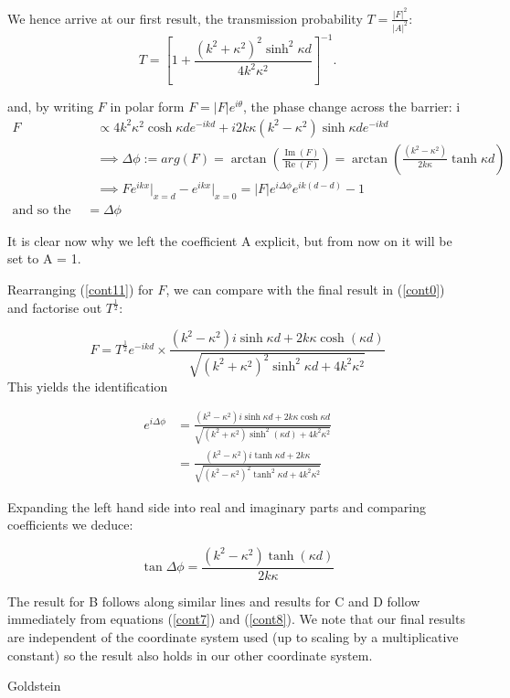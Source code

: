 \documentclass{article}
\begin{document}
We hence arrive at our first result, the transmission probability $T = \frac{|F|^2}{|A|^2}$:
\[
	T = [1+\frac{(k^2+\kappa^2)^2\sinh^2{\kappa d}}{4k^2\kappa^2}]^{-1}
.\] 

and, by writing $F$ in polar form $F = |F|e^{i\theta}$, the phase change across the barrier:
i
\begin{align}
	F &\propto 4k^2\kappa^2 \cosh{\kappa d}e^{-ikd}+i2k\kappa(k^2-\kappa^2)\sinh{\kappa d}e^{-ikd} \\
	  &\implies \Delta \phi := arg(F) = \arctan\left(\frac{\operatorname{Im}(F)}{\operatorname{Re}(F)}\right) = \arctan\left(\frac{(k^2-\kappa^2)}{2k\kappa}\tanh{\kappa d}\right) \\
	  &\implies Fe^{ikx}\rvert_{x=d}-e^{ikx}\rvert_{x=0} = |F|e^{i\Delta \phi}e^{ik(d-d)}-1 \\
	  \text{and so the phase change} = \Delta \phi
\end{align}

It is clear now why we left the coefficient A explicit, but from now on it will be set to A = 1.

Rearranging (\ref{cont11}) for $F$, we can compare with the final result in (\ref{cont0}) and factorise out $T^\frac{1}{2}$:

\[
	F = T^{\frac{1}{2}}e^{-ikd} \times \frac{(k^2-\kappa^2)i\sinh{\kappa d}+2k\kappa \cosh(\kappa d)}{\sqrt{(k^2+\kappa^2)^2\sinh^{2}{\kappa d}+4k^2\kappa^2}}
\] 
This yields the identification

\begin{align}
	e^{i\Delta\phi} &= \frac{(k^2-\kappa^2)i\sinh{\kappa d}+2k\kappa \cosh{\kappa d}}{\sqrt{(k^2+\kappa^2)\sinh^{2}(\kappa d)+4k^2\kappa^2}} \\
			&= \frac{(k^2-\kappa^2)i\tanh{\kappa d}+2k\kappa}{\sqrt{(k^2-\kappa^2)^2\tanh^2{\kappa d}+4k^2\kappa^2}}
\end{align}

Expanding the left hand side into real and imaginary parts and comparing coefficients we deduce:

\[
	\tan{\Delta\phi} = \frac{(k^2-\kappa^2)\tanh(\kappa d)}{2k\kappa}
\] 

The result for B follows along similar lines and results for C and D follow immediately from equations (\ref{cont7}) and (\ref{cont8}). We note that our final results are independent of the coordinate system used (up to scaling by a multiplicative constant) so the result also holds in our other coordinate system.

\begin{thebibliography}{100}
Goldstein

\end{thebibliography}
\end{document}
